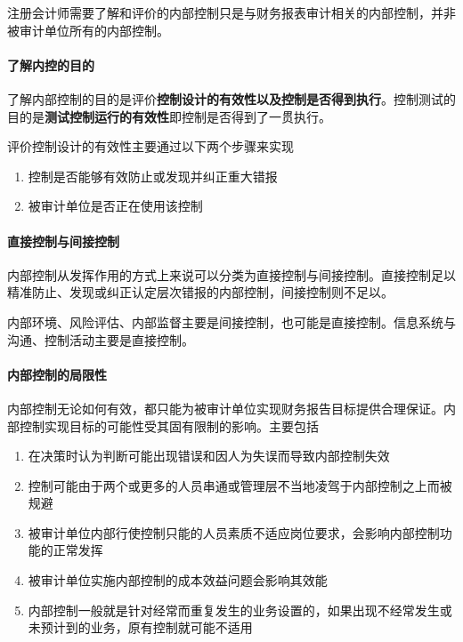 \documentclass[UTF8,12pt]{ctexart}
\numberwithin{equation}{section} %
\numberwithin{figure}{section}
\numberwithin{table}{section}
\begin{document}
	注册会计师需要了解和评价的内部控制只是与财务报表审计相关的内部控制，并非被审计单位所有的内部控制。
	
	\paragraph{了解内控的目的}了解内部控制的目的是评价\textbf{控制设计的有效性以及控制是否得到执行}。控制测试的目的是\textbf{测试控制运行的有效性}即控制是否得到了一贯执行。
	
	评价控制设计的有效性主要通过以下两个步骤来实现
	\begin{enumerate}
		\item 控制是否能够有效防止或发现并纠正重大错报
		
		\item 被审计单位是否正在使用该控制
	\end{enumerate}
	
	\paragraph{直接控制与间接控制}内部控制从发挥作用的方式上来说可以分类为直接控制与间接控制。直接控制足以精准防止、发现或纠正认定层次错报的内部控制，间接控制则不足以。
	
	内部环境、风险评估、内部监督主要是间接控制，也可能是直接控制。信息系统与沟通、控制活动主要是直接控制。
	
	\paragraph{内部控制的局限性} 内部控制无论如何有效，都只能为被审计单位实现财务报告目标提供合理保证。内部控制实现目标的可能性受其固有限制的影响。主要包括
	\begin{enumerate}
		\item 在决策时认为判断可能出现错误和因人为失误而导致内部控制失效
		
		\item 控制可能由于两个或更多的人员串通或管理层不当地凌驾于内部控制之上而被规避
		
		\item 被审计单位内部行使控制只能的人员素质不适应岗位要求，会影响内部控制功能的正常发挥
		
		\item 被审计单位实施内部控制的成本效益问题会影响其效能
		
		\item 内部控制一般就是针对经常而重复发生的业务设置的，如果出现不经常发生或未预计到的业务，原有控制就可能不适用
	\end{enumerate}
	
\end{document}
